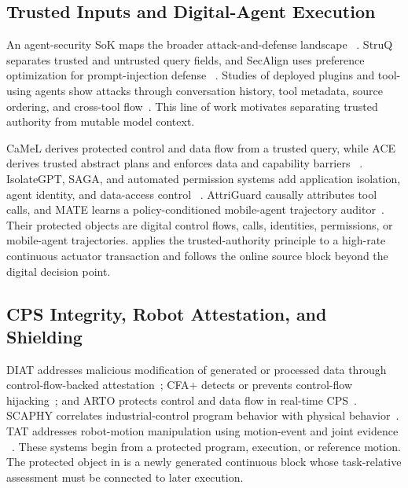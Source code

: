 \subsection{Trusted Inputs and Digital-Agent Execution}

An agent-security SoK maps the broader attack-and-defense landscape
~\cite{agenticsok2026}.  StruQ separates trusted and untrusted query fields, and
SecAlign uses preference optimization for prompt-injection defense
~\cite{struq2025,secalign2025}.  Studies of deployed plugins and tool-using
agents show attacks through conversation history, tool metadata, source
ordering, and cross-tool flow~\cite{webplugins2026,toolhijacker2026,
obliinjection2026,lesdissonances2026}.  This line of work motivates separating
trusted authority from mutable model context.

CaMeL derives protected control and data flow from a trusted query, while ACE
derives trusted abstract plans and enforces data and capability barriers
~\cite{camel2026,ace2026}.  IsolateGPT, SAGA, and automated permission systems
add application isolation, agent identity, and data-access control
~\cite{isolategpt2025,saga2026,agentpermissions2026}.  AttriGuard causally
attributes tool calls, and MATE learns a policy-conditioned mobile-agent
trajectory auditor~\cite{attriguard2026,mate2026}.  Their protected objects are
digital control flows, calls, identities, permissions, or mobile-agent
trajectories.  \system applies the trusted-authority principle to a high-rate
continuous actuator transaction and follows the online source block beyond the
digital decision point.

\subsection{CPS Integrity, Robot Attestation, and Shielding}

DIAT addresses malicious modification of generated or processed data through
control-flow-backed attestation~\cite{diat2019}; CFA+ detects or prevents
control-flow hijacking~\cite{cfaplus2024}; and ARTO protects control and data
flow in real-time CPS~\cite{arto2026}.  SCAPHY correlates industrial-control
program behavior with physical behavior~\cite{scaphy2023}.  TAT addresses
robot-motion manipulation using motion-event and joint evidence
~\cite{tat2026}.  These systems begin from a protected program, execution, or
reference motion.  The protected object in \system is a newly generated
continuous block whose task-relative assessment must be connected to later
execution.


